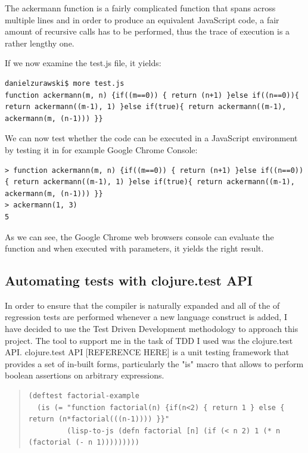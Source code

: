 The ackermann function is a fairly complicated function that spans across multiple lines and in order to produce an equivalent JavaScript code, a fair amount of recursive calls has to be performed, thus the trace of execution is a rather lengthy one. 

If we now examine the test.js file, it yields:

\begin{verbatim}
danielzurawski$ more test.js
function ackermann(m, n) {if((m==0)) { return (n+1) }else if((n==0)){ return ackermann((m-1), 1) }else if(true){ return ackermann((m-1), ackermann(m, (n-1))) }}
\end{verbatim}

We can now test whether the code can be executed in a JavaScript environment by testing it in for example Google Chrome Console: 

\begin{verbatim}
> function ackermann(m, n) {if((m==0)) { return (n+1) }else if((n==0)){ return ackermann((m-1), 1) }else if(true){ return ackermann((m-1), ackermann(m, (n-1))) }}
> ackermann(1, 3)
5
\end{verbatim}

As we can see, the Google Chrome web browsers console can evaluate the function and when executed with parameters, it yields the right result. 

\subsection{Automating tests with clojure.test API}
In order to ensure that the compiler is naturally expanded and all of the of regression tests are performed whenever a new language construct is added, I have decided to use the Test Driven Development methodology to approach this project. 
The tool to support me in the task of TDD I used was the clojure.test API.
clojure.test API [REFERENCE HERE] is a unit testing framework that provides a set of in-built forms, particularly the "is" macro that allows to perform boolean assertions on arbitrary expressions. 

\begin{quote}
\begin{verbatim}
(deftest factorial-example
  (is (= "function factorial(n) {if(n<2) { return 1 } else { return (n*factorial(((n-1)))) }}"
         (lisp-to-js (defn factorial [n] (if (< n 2) 1 (* n (factorial (- n 1)))))))))
\end{verbatim}
\end{quote}

